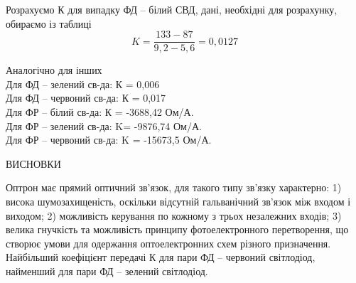 \documentclass[a4paper,14pt]{extreport}
\begin{document}
Розрахуємо К для випадку ФД – білий СВД, дані, необхідні для
розрахунку, обираємо із таблиці\\ 
\begin{equation}
K=\dfrac{ 133 - 87}{9,2-5,6  } = 0,0127
\end{equation}

Аналогічно для інших\\ 
Для  ФД – зелений св-да: К = 0,006\\ 
Для  ФД – червоний св-да: К = 0,017\\
Для  ФР – білий св-да:  К = -3688,42 Ом/А.\\
Для  ФР – зелений св-да: K= -9876,74 Ом/А.\\
Для  ФР – червоний св-да: K = -15673,5 Ом/А.\\ 


\begin{center}
ВИСНОВКИ
\end{center}

Оптрон має прямий оптичний зв’язок, для такого типу зв’язку характерно:
1) висока шумозахищеність, оскільки відсутній гальванічний зв'язок між
входом і виходом;
2) можливість керування по кожному з трьох незалежних входів;
3)
 велика
 гнучкість
 та
 можливість
 принципу
 фотоелектронного
перетворення, що створює умови для одержання оптоелектронних схем різного
призначення.
Найбільший коефіцієнт передачі К для пари ФД – червоний світлодіод,
найменший для пари ФД – зелений світлодіод.
\end{document}
